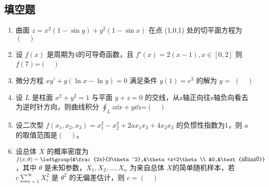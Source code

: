 \subsection{填空题}
\begin{enumerate}
\item 曲面 $z=x^2(1-\sin y)+y^2(1-\sin x)$  在点 (1,0,1) 处的切平面方程为$(\quad)$
\item 设 $f(x)$ 是周期为4的可导奇函数，且 $f'(x)=2(x-1),x \in [0,2]$  则 $f(7)$=$(\quad)$
\item 微分方程 $xy'+y(\ln x-\ln y)=0$ 满足条件 $y(1)=e^3$ 的解为 $y=$ $(\quad)$
\item 设 $L$ 是柱面 $x^2+y^2=1$ 与平面 $y+z=0$ 的交线，从z轴正向往z轴负向看去为逆时针方向，则曲线积分 $\displaystyle \oint_L z\dd{x}+y\dd{z}$=$(\quad)$
\item 设二次型 $f(x_1,x_2,x_3)=x_1^2-x_2^2+2ax_1x_3+4x_2x_3$  的负惯性指数为1，则 $a$ 的取值范围是$(\quad)$。
\item 设总体 $X$ 的概率密度为$f(x;\theta)=\leftgroup{&\frac{2x}{3\theta^2},&\theta<x<2\theta \\ &0,&\text{其他}} $ ，其中 $\theta$  是未知参数，$X_1,X_2,\dots,X_n$  为来自总体 $X$的简单随机样本，若  $\displaystyle c\sum_{n=1}^\infty X_i^2$ 是 $\theta^2$ 的无偏差估计，则 $c=(\quad)$
\end{enumerate}

